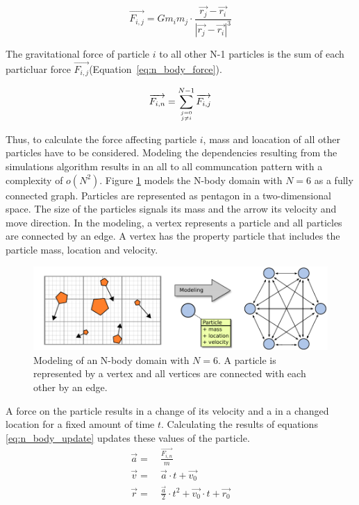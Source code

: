 \begin{equation}
  \label{eq:two_body_force}
  \overrightarrow{F_{i,j}} = G  m_i  m_j \cdot \frac{\overrightarrow{r_j} - \overrightarrow{r_i}}{|\overrightarrow{r_j} - \overrightarrow{r_i}|^3}
\end{equation}

The gravitational force of particle $i$ to all other N-1 particles
is the sum of each particluar force $\overrightarrow{F_{i,j}}$(Equation~\ref{eq:n_body_force}).

\begin{equation}
  \label{eq:n_body_force}
  \overrightarrow{F_{i,n}} = \sum_{j = 0 \atop j \neq i}^{N-1} \overrightarrow{F_{i,j}}
\end{equation}

Thus, to calculate the force affecting particle $i$, mass and
loacation of all other particles have to be considered. Modeling the
dependencies resulting from the simulations algorithm results in an
all to all communcation pattern with a complexity of $o(N^2)$. Figure
\ref{fig:nbody_modeling} models the N-body domain with $N = 6$ as a
fully connected graph. Particles are represented as pentagon in a
two-dimensional space. The size of the particles signals its mass and
the arrow its velocity and move direction.  In the modeling, a vertex
represents a particle and all particles are connected by an edge. A
vertex has the property particle that includes the particle mass,
location and velocity.

\begin{figure}[H]
  \centering \includegraphics[width=\textwidth]{graphics/30_nbody_modeling}
  \caption{Modeling of an N-body domain with $N = 6$. A particle is represented
  by a vertex and all vertices are connected with each other by an edge.}
  \label{fig:nbody_modeling}
\end{figure}

A force on the particle results in a change of its velocity and a
in a changed location for a fixed amount of time $t$. Calculating
the results of equations \ref{eq:n_body_update} updates these
values of the particle.
\begin{align}
  \label{eq:n_body_update}
  \overrightarrow{a} =&~ \frac{\overrightarrow{F_{i,n}}}{m}\\
  \overrightarrow{v} =&~ \overrightarrow{a} \cdot t + \overrightarrow{v_0}\\
  \overrightarrow{r} =&~ \frac{\overrightarrow{a}}{2} \cdot t^2 + \overrightarrow{v_0} \cdot t + \overrightarrow{r_0}
\end{align}




